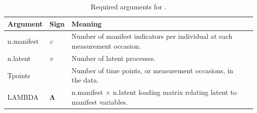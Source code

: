\documentclass[nojss]{jss}\usepackage[]{graphicx}\usepackage[]{color}
\begin{document}
\begin{table}\footnotesize
\begin{tabular}{l|l|l p{8cm} }
\textbf{Argument} & \textbf{Sign} & \textbf{Meaning}\\
\hline
n.manifest & \textit{c} & Number of manifest indicators per individual at each measurement occasion.\\
n.latent & \textit{v} & Number of latent processes.\\
Tpoints & & Number of time points, or measurement occasions, in the data.\\
LAMBDA & $\boldsymbol{\Lambda}$& n.manifest $\times$ n.latent loading matrix relating latent to manifest variables.\\
\end{tabular}
\caption{\label{table:ctspecrequired}Required arguments for .}



\end{table}
\end{document}
